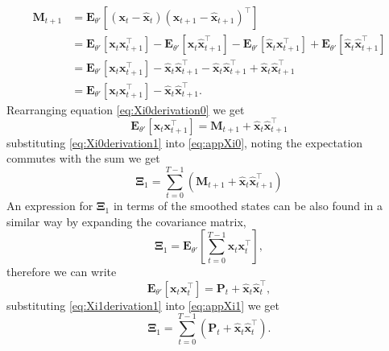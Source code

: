 \documentclass[review,authoryear,3p]{elsarticle}
\begin{document}
\begin{align}\label{eq:Xi0derivation0} 
 \mathbf M_{t+1}&=\mathbf E_{\theta'}\left[(\mathbf x_t-\mathbf{\hat x}_t)(\mathbf x_{t+1}-\mathbf{\hat x}_{t+1})^\top\right] \nonumber \\
&=\mathbf E_{\theta'}\left[\mathbf x_t\mathbf x_{t+1}^\top\right]-\mathbf E_{\theta'}\left[\mathbf x_t\hat{\mathbf x}_{t+1}^\top\right]-\mathbf E_{\theta'}\left[\hat{\mathbf x}_t\mathbf x_{t+1}^\top\right]+\mathbf E_{\theta'}\left[\hat{\mathbf x}_t\hat{\mathbf x}_{t+1}^\top\right]  \nonumber \\
&= \mathbf E_{\theta'}\left[\mathbf x_t\mathbf x_{t+1}^\top\right]-\hat{\mathbf x}_t\hat{\mathbf x}_{t+1}^\top-\hat{\mathbf x}_t\hat{\mathbf x}_{t+1}^\top+\hat{\mathbf x}_t\hat{\mathbf x}_{t+1}^\top\nonumber \\
&= \mathbf E_{\theta'}\left[\mathbf x_t\mathbf x_{t+1}^\top\right]-\hat{\mathbf x}_t\hat{\mathbf x}_{t+1}^\top.
\end{align}
Rearranging  equation \eqref{eq:Xi0derivation0} we get
\begin{equation}\label{eq:Xi0derivation1}
 \mathbf E_{\theta'}\left[\mathbf x_t\mathbf x_{t+1}^\top\right]=\mathbf M_{t+1}+\mathbf {\hat x}_t\mathbf{\hat x}_{t+1}^\top
\end{equation}
substituting \ref{eq:Xi0derivation1} into \ref{eq:appXi0}, noting the expectation commutes with the sum we get
\begin{equation}
 \boldsymbol\Xi_1=\sum_{t=0}^{T-1}\left(\mathbf M_{t+1}+\mathbf{\hat x}_t\mathbf{\hat x}_{t+1}^\top\right)
\end{equation}   
An expression for $\boldsymbol\Xi_1$ in terms of the smoothed states can be also found in a similar way by expanding the covariance matrix,
\begin{equation}\label{eq:appXi1}
 \boldsymbol\Xi_1=\mathbf E_{\theta'}\left[\sum_{t=0}^{T-1}\mathbf x_{t}\mathbf x_{t}^\top\right],
\end{equation}
therefore we can write
\begin{equation}\label{eq:Xi1derivation1}
 \mathbf E_{\theta'}\left[\mathbf x_{t}\mathbf x_{t}^\top\right]=\mathbf P_{t}+\mathbf {\hat x}_{t}\mathbf{\hat x}_{t}^\top,
\end{equation}
substituting \ref{eq:Xi1derivation1} into \ref{eq:appXi1} we get
\begin{equation}
 \boldsymbol\Xi_1=\sum_{t=0}^{T-1}\left(\mathbf P_{t}+\mathbf{\hat x}_{t}\mathbf{\hat x}_{t}^\top\right).
\end{equation}
\newpage
 

\end{document}
